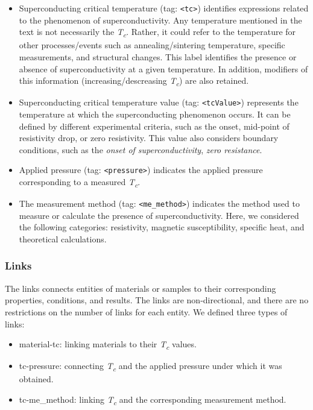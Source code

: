 \documentclass[]{interact}
\theoremstyle{plain}%
\theoremstyle{definition}
\theoremstyle{remark}
\begin{document}
\begin{itemize}
\item Superconducting critical temperature (tag: \texttt{<tc>}) identifies expressions related to the phenomenon of superconductivity. Any temperature mentioned in the text is not necessarily the \textit{T\textsubscript{c}}. Rather, it could refer to the temperature for other processes/events such as annealing/sintering temperature, specific measurements, and structural changes.
This label identifies the presence or absence of superconductivity at a given temperature.
In addition, modifiers of this information (increasing/descreasing \textit{T\textsubscript{c}}) are also retained. 

\item Superconducting critical temperature value (tag: \texttt{<tcValue>}) represents the temperature at which the superconducting phenomenon occurs. 
It can be defined by different experimental criteria, such as the onset, mid-point of resistivity drop, or zero resistivity.
This value also considers boundary conditions, such as the \textit{onset of superconductivity}, \textit{zero resistance}. 

\item Applied pressure (tag: \texttt{<pressure>}) indicates the applied pressure corresponding to a measured \textit{T\textsubscript{c}}. 

\item The measurement method (tag: \texttt{<me\_method>}) indicates the method used to measure or calculate the presence of superconductivity. Here, we considered the following categories: resistivity, magnetic susceptibility, specific heat, and theoretical calculations. 
\end{itemize}

\subsubsection{Links}
The links connects entities of materials or samples to their corresponding properties, conditions, and results. 
The links are non-directional, and there are no restrictions on the number of links for each entity. 
We defined three types of links:

\begin{itemize}
    \item material-tc: linking materials to their \textit{T\textsubscript{c}} values.
    \item tc-pressure: connecting \textit{T\textsubscript{c}} and the applied pressure under which it was obtained.
    \item tc-me\_method: linking \textit{T\textsubscript{c}} and the corresponding measurement method. 
\end{itemize}
\end{document}
